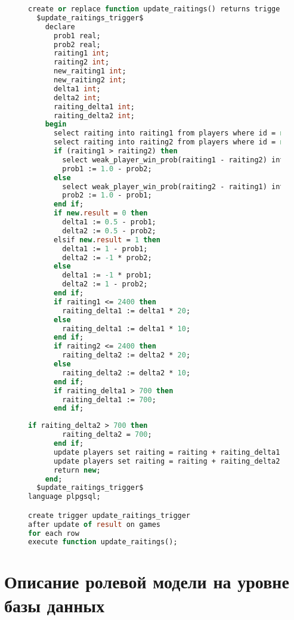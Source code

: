 \begin{figure}[H]
	\begin{lstlisting}[label=update_raitings_lst1,caption=Триггер обновления рейтинга игроков (начало),language=Caml]
create or replace function update_raitings() returns trigger as
  $update_raitings_trigger$
    declare
      prob1 real;
      prob2 real;
      raiting1 int;
      raiting2 int;
      new_raiting1 int;
      new_raiting2 int;
      delta1 int;
      delta2 int;
      raiting_delta1 int;
      raiting_delta2 int;
    begin
      select raiting into raiting1 from players where id = new.first_player_id;
      select raiting into raiting2 from players where id = new.second_player_id;
      if (raiting1 > raiting2) then
        select weak_player_win_prob(raiting1 - raiting2) into prob2;
        prob1 := 1.0 - prob2;
      else
        select weak_player_win_prob(raiting2 - raiting1) into prob1;
        prob2 := 1.0 - prob1;
      end if;
      if new.result = 0 then
        delta1 := 0.5 - prob1;
        delta2 := 0.5 - prob2;
      elsif new.result = 1 then
        delta1 := 1 - prob1;
        delta2 := -1 * prob2;
      else
        delta1 := -1 * prob1;
        delta2 := 1 - prob2;
      end if;
      if raiting1 <= 2400 then
        raiting_delta1 := delta1 * 20;
      else
        raiting_delta1 := delta1 * 10;
      end if;
      if raiting2 <= 2400 then
        raiting_delta2 := delta2 * 20;
      else
        raiting_delta2 := delta2 * 10;
      end if;
      if raiting_delta1 > 700 then
        raiting_delta1 := 700;
      end if;
	\end{lstlisting}
\end{figure}
\begin{figure}[H]
	\begin{lstlisting}[label=update_raitings_lst2,caption=Триггер обновления рейтинга игроков (конец),language=Caml]
      if raiting_delta2 > 700 then
        raiting_delta2 = 700;
      end if;
      update players set raiting = raiting + raiting_delta1 where id = new.first_player_id;
      update players set raiting = raiting + raiting_delta2 where id = new.second_player_id;
      return new;
    end;
  $update_raitings_trigger$
language plpgsql;

create trigger update_raitings_trigger
after update of result on games
for each row 
execute function update_raitings();
	\end{lstlisting}
\end{figure}

\section{Описание ролевой модели на уровне базы данных}


